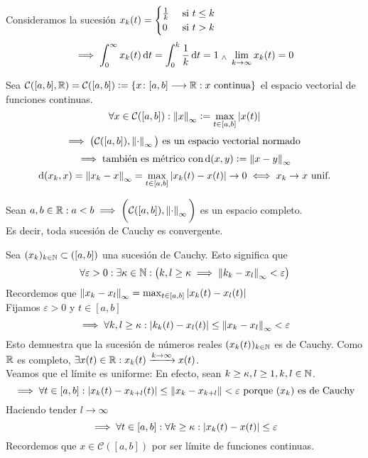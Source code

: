 \begin{ejem} %
	Consideramos la sucesión $x_k(t) = \begin{cases}
		\frac{1}{k} & \text{ si } t\leq k \\
		0 & \text{ si } t>k 
	\end{cases}$
	\[\implies \int_{0}^{\infty} x_k(t) \odif{t} = \int_{0}^{k} \frac{1}{k} \odif{t} = 1 \we \lim_{k\to\infty} x_k(t) = 0\]
\end{ejem}

Sea $\mathcal{C}([a,b], \mathbb{R})=\mathcal{C}([a,b]) \vcentcolon= \left\{x \colon [a,b] \longrightarrow \mathbb{R} : x\text{ continua}\right\}$ el espacio vectorial de funciones continuas.
\[\forall x \in \mathcal{C}([a,b]) : \left\Vert x\right\Vert_{\infty} \vcentcolon= \max_{t\in [a,b]} \left|x(t)\right|\]
\[\implies \big(\mathcal{C}([a,b]), \left\Vert\cdot\right\Vert_\infty\big) \text{ es un espacio vectorial normado }\]
\[\implies \text{también es métrico con} \operatorname{d}(x,y)\vcentcolon=\left\Vert x-y\right\Vert_\infty\]
\[\operatorname{d}(x_k, x) = \left\Vert x_k-x\right\Vert_\infty=\max_{t\in [a,b]} \left|x_k(t)-x(t)\right| \rightarrow0 \iff x_k\to x \text{ unif.}\]
\begin{teo}
	Sean $a, b \in \mathbb{R} : a<b \implies \displaystyle \bigg(\mathcal{C}([a,b]), \left\Vert\cdot\right\Vert_\infty\bigg)$ es un espacio completo.\\Es decir, toda sucesión de Cauchy es convergente.
	\begin{dem}
		Sea $(x_k)_{k\in \mathbb{N}}\subset \mathcal([a,b])$ una sucesión de Cauchy. Esto significa que
		\[\forall \varepsilon > 0 : \exists \kappa \in \mathbb{N} : \big(k, l\geq \kappa \implies \left\Vert k_k-x_l\right\Vert_\infty <\varepsilon\big) \]
		Recordemos que $\left\Vert x_k-x_l\right\Vert_\infty = \max_{t\in[a,b]}\left|x_k(t)-x_l(t)\right|$\\
		Fijamos $\varepsilon > 0$ y $t\in [a,b]$
		\[\implies \forall k, l \geq \kappa : \left|k_k(t) - x_l(t)\right| \leq \left\Vert x_k-x_l\right\Vert_\infty < \varepsilon\]
		Esto demuestra que la sucesión de números reales $(x_k(t))_{k\in\mathbb{N}}$ es de Cauchy. Como $\mathbb{R}$ es completo, $\exists x(t) \in \mathbb{R} : x_k(t) \xrightarrow{k\to\infty} x(t)$. \\
		Veamos que el límite es uniforme: En efecto, sean $k\geq \kappa, l \geq 1, k, l \in \mathbb{N}$.
		\[\implies \forall t \in [a,b] : \left|x_k(t)-x_{k+l}(t)\right| \leq \left\Vert x_k-x_{k+l}\right\Vert < \varepsilon \text{ porque $(x_k)$ es de Cauchy}\]
		Haciendo tender $l\to\infty$
		\[\implies \forall t \in [a,b] : \forall k \geq \kappa : \left|x_k(t)-x(t)\right|\leq \varepsilon\]
		Recordemos que $x\in\mathcal{C}([a,b])$ por ser límite de funciones continuas.
	\end{dem}
\end{teo}
